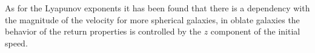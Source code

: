 	As for the Lyapunov exponents it has been found that there is a dependency with the magnitude of the velocity for more spherical galaxies, in oblate galaxies the behavior of the return properties is controlled by the $z$ component of the initial speed.
	

%

